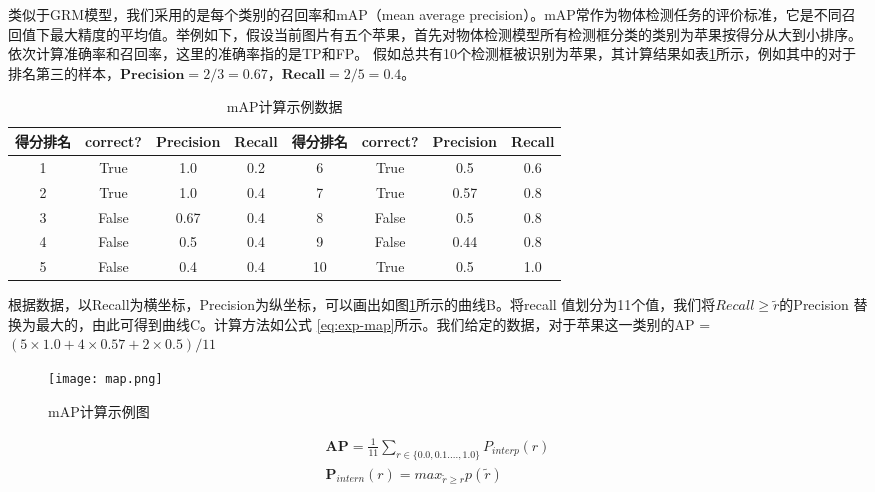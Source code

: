 类似于GRM模型，我们采用的是每个类别的召回率和mAP（mean average precision）。mAP常作为物体检测任务的评价标准，它是不同召回值下最大精度的平均值。举例如下，假设当前图片有五个苹果，首先对物体检测模型所有检测框分类的类别为苹果按得分从大到小排序。依次计算准确率和召回率，这里的准确率指的是TP和FP。 假如总共有10个检测框被识别为苹果，其计算结果如表\ref{tab:exp-map}所示，例如其中的对于排名第三的样本，$\textbf{Precision} = 2/3 = 0.67$，$\textbf{Recall} = 2/5 = 0.4$。
\begin{table}[htpb]
  \centering
  \caption{mAP计算示例数据}
  \label{tab:exp-map}
  \begin{tabular}{c|c|c|c|c|c|c|c}
    \toprule
    \textbf{得分排名} & \textbf{correct?} & \textbf{Precision} & \textbf{Recall}  & \textbf{得分排名} & \textbf{correct?} & \textbf{Precision} & \textbf{Recall}   \\
    \midrule
    1 & True & 1.0 & 0.2  & 6 & True & 0.5 & 0.6    \\
    \midrule
    2 &  True & 1.0 & 0.4  & 7 & True & 0.57 & 0.8  \\
    \midrule
    3 & False & 0.67 & 0.4  & 8 & False & 0.5 & 0.8  \\
    \midrule
    4 & False & 0.5 & 0.4   & 9 & False & 0.44 & 0.8 \\
    \midrule
    5 & False & 0.4 & 0.4  & 10 & True & 0.5 & 1.0 \\
    \bottomrule
  \end{tabular}
\end{table}
根据数据，以Recall为横坐标，Precision为纵坐标，可以画出如图\ref{fig:exp-map}所示的曲线B。将recall 值划分为11个值，我们将$Recall \geq \widetilde{r}$的Precision 替换为最大的，由此可得到曲线C。计算方法如公式
\ref{eq:exp-map}所示。我们给定的数据，对于苹果这一类别的AP = $(5 \times 1.0 + 4 \times 0.57 + 2 \times 0.5)/11$
\begin{figure}[htpb]
	\centering
	\texttt{[image: map.png]}
    \caption{mAP计算示例图}
	\vspace*{-3.5mm}
	\label{fig:exp-map}
\end{figure}
\begin{equation} \label{eq:exp-map}
\begin{split}
    \mathbf{AP} = \frac{1}{11}\sum_{r \in \{0.0,0.1....,1.0\}}P_{interp}(r) \\
    \mathbf{P}_{intern}(r) = max_{\widetilde{r} \geq r}p(\widetilde{r})
\end{split}
\end{equation}

